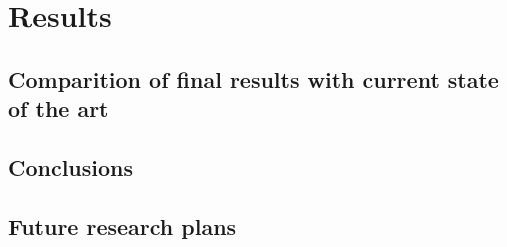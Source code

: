 \section{Results}

\subsection{Comparition of final results with current state of the art}

\subsection{Conclusions}

\subsection{Future research plans}






